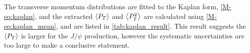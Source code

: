 \documentclass[../main.tex]{subfiles}
\begin{document}
\begin{table}[h!]
	\centering
	\caption{The $\expval{p_T}$ (in \unit{\GeV}) and  $d\sigma/dp^2_T$ (in \unit{\nano\barn\GeV^{-2} nucleon^{-1}}) for $p+p$ extracted from run 5-6}
	
\end{table}
\begin{table}[h!]
	\centering
	\caption{The $\expval{p_T}$ (in \unit{\GeV}) and  $d\sigma/dp^2_T$ (in \unit{\nano\barn\GeV^{-2} nucleon^{-1}}) for $p+d$ extracted from run 5-6}
	
\end{table}

The transverse momentum distributions are fitted to the Kaplan form, \cref{M-eq:kaplan}, and the extracted
$\expval{P_T}$ and $\expval{P^2_T}$ are calculated using \cref{M-eq:kaplan_mean},
and are listed in \cref{tab:kaplan_result}. This result suggests the
$\expval{P_T}$ is larger for the $J/\psi$ production, however the systematic uncertainties are too
large to make a conclusive statement.
\end{document}
